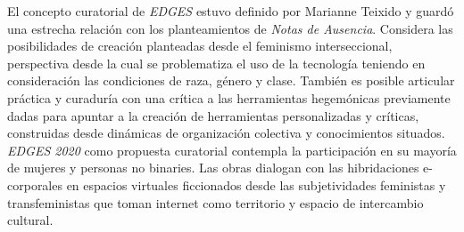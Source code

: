 
El concepto curatorial de \textit{EDGES} estuvo definido por Marianne Teixido y guardó una estrecha relación con los planteamientos de \textit{Notas de Ausencia}. Considera las posibilidades de creación planteadas desde el feminismo interseccional, perspectiva desde la cual se problematiza el uso de la tecnología teniendo en consideración las condiciones de raza, género y clase. También es posible articular práctica y curaduría con una crítica a las herramientas hegemónicas previamente dadas para apuntar a la creación de herramientas personalizadas y críticas, construidas desde dinámicas de organización colectiva y conocimientos situados. \textit{EDGES 2020} como propuesta curatorial contempla la participación en su mayoría de mujeres y personas no binaries. Las obras dialogan con las hibridaciones e-corporales en espacios virtuales ficcionados desde las subjetividades feministas y transfeministas que toman internet como territorio y espacio de intercambio cultural.

\iffalse
- Uso de espacios tridimensionales 
- Bots y literatura 
- Datos que transforman el espacio   
- Ensayos digitales en la web
- cyberfeminisimo
- audio virtualmente posicionado 
- streaming de audio y video sin plataformas privativas - decisiones de optimización
- Según yo aquí usamos icecast y liquid soap 
- Inicios de multiplayer
\fi
